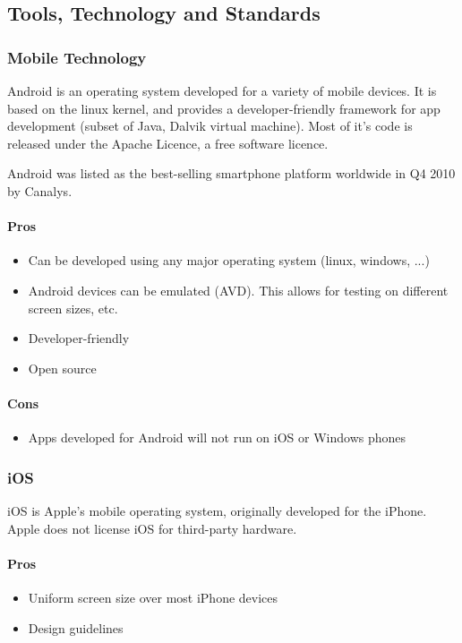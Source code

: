 \subsection{Tools, Technology and Standards}
\subsubsection{Mobile Technology}

	Android is an operating system developed for a variety of mobile devices.
	It is based on the linux kernel, and provides a developer-friendly
	framework for app development (subset of Java, Dalvik virtual machine).
	Most of it's code is released under the Apache Licence, a free software
	licence.

	Android was listed as the best-selling smartphone platform worldwide in Q4
	2010 by Canalys. \cite{wiki:android}

	\paragraph{Pros}
		\begin{itemize}
			\item Can be developed using any major operating system (linux, windows, ...)
			\item Android devices can be emulated (AVD). This allows for testing on
			different screen sizes, etc.
			\item Developer-friendly
			\item Open source
		\end{itemize}

	\paragraph{Cons}
		\begin{itemize}
			\item Apps developed for Android will not run on iOS or Windows phones
		\end{itemize}

\subsubsection{iOS}

	iOS is Apple's mobile operating system, originally developed for the
	iPhone. Apple does not license iOS for third-party hardware.

	\paragraph{Pros}
	\begin{itemize}
		\item Uniform screen size over most iPhone devices
		\item Design guidelines
	\end{itemize}

